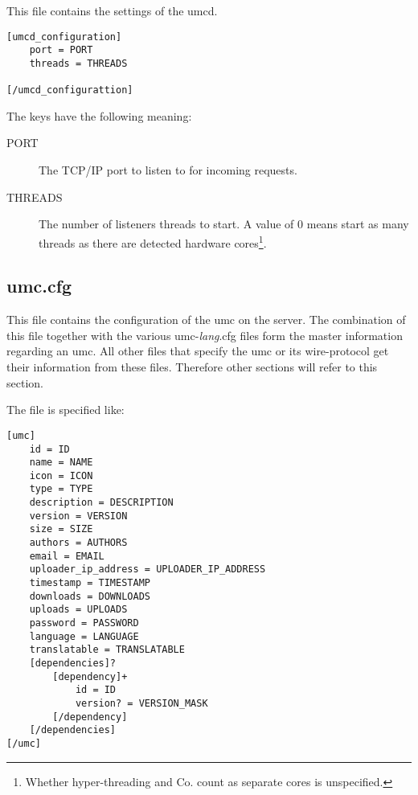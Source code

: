 This file contains the settings of the umcd.

\begin{lstlisting}
[umcd_configuration]
	port = PORT
	threads = THREADS

[/umcd_configurattion]
\end{lstlisting}

The keys have the following meaning:
\begin{description}
\item[PORT]
	The TCP/IP port to listen to for incoming requests.

\item[THREADS]
	The number of listeners threads to start. A value of $0$ means start as
	many threads as there are detected hardware cores\footnote{Whether
	hyper-threading and Co. count as separate cores is unspecified.}.

\end{description}


\subsection{umc.cfg}
\label{section:communication_protocol:server:umc.cfg}

This file contains the configuration of the umc on the server. The
combination of this file together with the various
\mbox{umc-\emph{lang}.cfg} files form the master information regarding an
umc. All other files that specify the umc or its wire-protocol get their
information from these files. Therefore other sections will refer to this
section.

The file is specified like:
\begin{lstlisting}
[umc]
	id = ID
	name = NAME
	icon = ICON
	type = TYPE
	description = DESCRIPTION
	version = VERSION
	size = SIZE
	authors = AUTHORS
	email = EMAIL
	uploader_ip_address = UPLOADER_IP_ADDRESS
	timestamp = TIMESTAMP
	downloads = DOWNLOADS
	uploads = UPLOADS
	password = PASSWORD
	language = LANGUAGE
	translatable = TRANSLATABLE
	[dependencies]?
		[dependency]+
			id = ID
			version? = VERSION_MASK
		[/dependency]
	[/dependencies]
[/umc]
\end{lstlisting}

